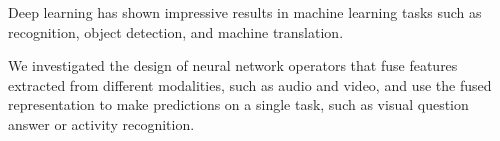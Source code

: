 Deep learning has shown impressive results in machine learning tasks such as
recognition, object detection, and machine translation.

We investigated the design of neural network operators that fuse features
extracted from different modalities, such as audio and video, and use the fused
representation to make predictions on a single task, such as visual question
answer or activity recognition.
